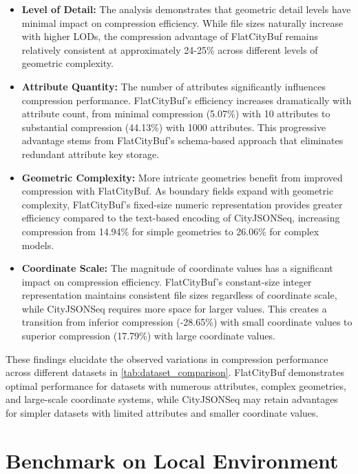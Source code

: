 \begin{itemize}
  \item \textbf{Level of Detail:} The analysis demonstrates that geometric detail levels have minimal impact on compression efficiency. While file sizes naturally increase with higher LODs, the compression advantage of FlatCityBuf remains relatively consistent at approximately 24-25\% across different levels of geometric complexity.

  \item \textbf{Attribute Quantity:} The number of attributes significantly influences compression performance. FlatCityBuf's efficiency increases dramatically with attribute count, from minimal compression (5.07\%) with 10 attributes to substantial compression (44.13\%) with 1000 attributes. This progressive advantage stems from FlatCityBuf's schema-based approach that eliminates redundant attribute key storage.

  \item \textbf{Geometric Complexity:} More intricate geometries benefit from improved compression with FlatCityBuf. As boundary fields expand with geometric complexity, FlatCityBuf's fixed-size numeric representation provides greater efficiency compared to the text-based encoding of CityJSONSeq, increasing compression from 14.94\% for simple geometries to 26.06\% for complex models.

  \item \textbf{Coordinate Scale:} The magnitude of coordinate values has a significant impact on compression efficiency. FlatCityBuf's constant-size integer representation maintains consistent file sizes regardless of coordinate scale, while CityJSONSeq requires more space for larger values. This creates a transition from inferior compression (-28.65\%) with small coordinate values to superior compression (17.79\%) with large coordinate values.
\end{itemize}

These findings elucidate the observed variations in compression performance across different datasets in \autoref{tab:dataset_comparison}. FlatCityBuf demonstrates optimal performance for datasets with numerous attributes, complex geometries, and large-scale coordinate systems, while CityJSONSeq may retain advantages for simpler datasets with limited attributes and smaller coordinate values.

\section{Benchmark on Local Environment}
\label{result:benchmark_on_local_environment}

